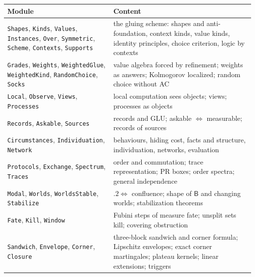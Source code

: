 \documentclass[11pt]{article}
\theoremstyle{definition}
\theoremstyle{remark}
\newcommand{\B}{\mathsf{B}}
\newcommand{\lean}[1]{\texttt{#1}}
\begin{document}
\begin{longtable}{p{}p{}}
\toprule
Module & Content\\
\midrule\endhead
\lean{Shapes}, \lean{Kinds}, \lean{Values}, \lean{Instances}, \lean{Over}, \lean{Symmetric}, \lean{Scheme}, \lean{Contexts}, \lean{Supports} & the gluing scheme: shapes and anti-foundation, context kinds, value kinds, identity principles, choice criterion, logic by contexts\\
\lean{Grades}, \lean{Weights}, \lean{WeightedGlue}, \lean{WeightedKind}, \lean{RandomChoice}, \lean{Socks} & value algebra forced by refinement; weights as answers; Kolmogorov localized; random choice without AC\\
\lean{Local}, \lean{Observe}, \lean{Views}, \lean{Processes} & local computation sees objects; views; processes as objects\\
\lean{Records}, \lean{Askable}, \lean{Sources} & records and GLU; askable $\Leftrightarrow$ measurable; records of sources\\
\lean{Circumstances}, \lean{Individuation}, \lean{Network} & behaviours, hiding cost, facts and structure, individuation, networks, evaluation\\
\lean{Protocols}, \lean{Exchange}, \lean{Spectrum}, \lean{Traces} & order and commutation; trace representation; PR boxes; order spectra; general independence\\
\lean{Modal}, \lean{Worlds}, \lean{WorldsStable}, \lean{Stabilize} & $.2\Leftrightarrow$ confluence; shape of $\B$ and changing worlds; stabilization theorems\\
\lean{Fate}, \lean{Kill}, \lean{Window} & Fubini steps of measure fate; unsplit sets kill; covering obstruction\\
\lean{Sandwich}, \lean{Envelope}, \lean{Corner}, \lean{Closure} & three-block sandwich and corner formula; Lipschitz envelopes; exact corner martingales; plateau kernels; linear extensions; triggers\\
\bottomrule
\end{longtable}
\end{document}
